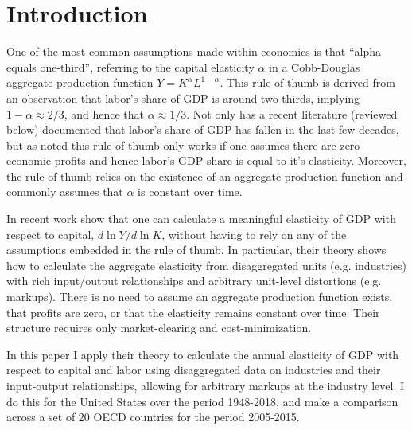\documentclass[11pt]{article}
\begin{document}
\section{Introduction}
\onehalfspacing One of the most common assumptions made within economics is that ``alpha equals one-third'', referring to the capital elasticity $\alpha$ in a Cobb-Douglas aggregate production function $Y = K^{\alpha}L^{1-\alpha}$. This rule of thumb is derived from an observation that labor's share of GDP is around two-thirds, implying $1-\alpha \approx 2/3$, and hence that $\alpha \approx 1/3$. Not only has a recent literature (reviewed below) documented that labor's share of GDP has fallen in the last few decades, but as \cite{hall1988,hall1990} noted this rule of thumb only works if one assumes there are zero economic profits and hence labor's GDP share is equal to it's elasticity. Moreover, the rule of thumb relies on the existence of an aggregate production function and commonly assumes that $\alpha$ is constant over time.

In recent work \cite{bfshortnote,bfprodge} show that one can calculate a meaningful elasticity of GDP with respect to capital, $d \ln Y/ d \ln K$, without having to rely on any of the assumptions embedded in the rule of thumb. In particular, their theory shows how to calculate the aggregate elasticity from disaggregated units (e.g. industries) with rich input/output relationships and arbitrary unit-level distortions (e.g. markups). There is no need to assume an aggregate production function exists, that profits are zero, or that the elasticity remains constant over time. Their structure requires only market-clearing and cost-minimization.

In this paper I apply their theory to calculate the annual elasticity of GDP with respect to capital and labor using disaggregated data on industries and their input-output relationships, allowing for arbitrary markups at the industry level. I do this for the United States over the period 1948-2018, and make a comparison across a set of 20 OECD countries for the period 2005-2015. 
\end{document}
